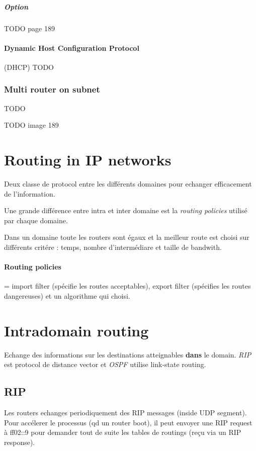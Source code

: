 \documentclass{report}
\begin{document}
\subparagraph{Option}
TODO page 189

\paragraph{Dynamic Host Configuration Protocol} (DHCP)
TODO

\subsubsection{Multi router on subnet}
TODO



TODO image 189

\section{Routing in IP networks}
Deux classe de protocol entre les différents domaines pour echanger
efficacement de l'information.

Une grande différence entre intra et inter domaine est la \textit{routing policies}
utilisé par chaque domaine.

Dans un domaine toute les routers sont égaux et la meilleur route est choisi sur
différents critére : temps, nombre d'intermédiare et taille de bandwith.

\paragraph{Routing  policies}  =  import filter  (spécifie  les  routes
acceptables), export  filter (spécifies  les routes dangereuses)  et un
algorithme qui choisi.


\section{Intradomain routing}
Echange des informations sur les destinations atteignables \textbf{dans} le domain.
\textit{RIP} est protocol de distance vector et \textit{OSPF} utilise link-state routing.

\subsection{RIP}
Les routers echanges periodiquement des RIP messages (inside UDP segment).
Pour accélerer le processus (qd un router boot), il peut envoyer une RIP request à ff02::9 
pour demander tout de suite les tables de routings (reçu via un RIP response).
\end{document}

